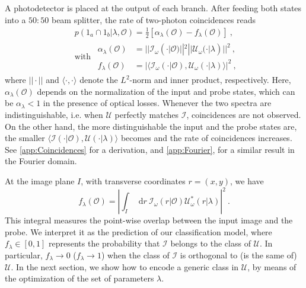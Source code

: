 \documentclass[reprint,
superscriptaddress,
nofootinbib,
aps,
pra,
showkeys
]{revtex4-2}
\newcommand*\dif{\mathop{}\!\mathrm{d}}
\newcommand{\I}{\mathcal{I}}
\newcommand{\U}{\mathcal{U}}
\newcommand{\f}{f}
\renewcommand{\O}{\mathcal{O}}
\begin{document}
A photodetector is placed at the output of each branch. After feeding both states into a $50\!:\!50$ beam splitter, the rate of two-photon coincidences reads
\begin{align}
    & p(1_a \cap 1_b|\lambda, \O) = \frac{1}{2}\left[\alpha_\lambda(\O) - \f_\lambda(\O) \right] \ ,
    \label{eq:BosonicCoincidences} \\
    & \text{with} \ \ \begin{aligned}
		\alpha_\lambda(\O) &= || \I_\omega(\cdot|\O) ||^2 || \U_\omega(\cdot|\lambda) ||^2  \ , \\
		\f_\lambda(\O) &=  \left| \langle \I_\omega(\cdot|\O),\U_\omega (\cdot|\lambda) \rangle \right|^2 \ ,
	\end{aligned}
\end{align}
where $|| \cdot ||$ and $\langle \cdot , \cdot \rangle$ denote the $L^2$-norm and inner product, respectively. Here, $\alpha_\lambda(\O)$ depends on the normalization of the input and probe states, which can be $\alpha_{\lambda} < 1$ in the presence of optical losses. Whenever the two spectra are indistinguishable, i.e. when $\U$ perfectly matches $\I$, coincidences are not observed. On the other hand, the more distinguishable the input and the probe states are, the smaller $\langle \I(\cdot|\O),\U(\cdot|\lambda) \rangle$ becomes and the rate of coincidences increases. See \cref{app:Coincidences} for a derivation, and \cref{app:Fourier}, for a similar result in the Fourier domain.

At the image plane $I$, with transverse coordinates $r = (x,y)$, we have
\begin{equation}
	 \f_\lambda(\O) = \left| \int_I \dif r \ \I_\omega(r|\O)\U_{\omega}^*(r|\lambda) \right|^2 \ .
	 \label{eq:NetworkBraketPosition}
\end{equation}
This integral measures the point-wise overlap between the input image and the probe. We interpret it as the prediction of our classification model, where $\f_\lambda \in [0,1]$ represents the probability that $\I$ belongs to the class of $\U$. In particular, $\f_\lambda \to 0$ ($\f_\lambda \to 1$) when the class of $\I$ is orthogonal to (is the same of) $\U$. In the next section, we show how to encode a generic class in $\U$, by means of the optimization of the set of parameters $\lambda$.
\end{document}
